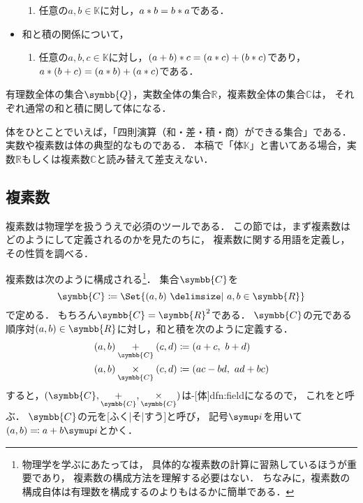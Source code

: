 \documentclass[../sotsu.tex]{subfiles}
\begin{document}
\begin{definition}[体]
\begin{itemize}
\begin{enumerate}[resume]
            \item \label{field:prod-commutative} 任意の$a, b \in 𝕂$に対し，$a \mathbin{\ast} b = b \mathbin{\ast} a$である．
        \end{enumerate}
        \item 和と積の関係について，
        \begin{enumerate}[resume]
            \item \label{field:distributive} 任意の$a, b, c \in 𝕂$に対し，$(a + b) \mathbin{\ast} c = (a \mathbin{\ast} c) + (b \mathbin{\ast} c)$であり，$a \mathbin{\ast} (b + c) = (a \mathbin{\ast} b) + (a \mathbin{\ast} c)$である．
        \end{enumerate}    
    \end{itemize}
\end{definition}

\begin{example}
    有理数全体の集合$\symbb{Q}$，実数全体の集合$ℝ$，複素数全体の集合$ℂ$は，
    それぞれ通常の和と積に関して体になる．
\end{example}

体をひとことでいえば，「四則演算（和・差・積・商）ができる集合」である．
実数や複素数は体の典型的なものである．
本稿で「体$𝕂$」と書いてある場合，実数$ℝ$もしくは複素数$ℂ$と読み替えて差支えない．



\subsection{複素数}
\label{sec:complex-number-field}

複素数は物理学を扱ううえで必須のツールである．
この節では，まず複素数はどのようにして定義されるのかを見たのちに，
複素数に関する用語を定義し，その性質を調べる．


複素数は次のように構成される\footnote{
    物理学を学ぶにあたっては，
    具体的な複素数の計算に習熟しているほうが重要であり，
    複素数の構成方法を理解する必要はない．
    ちなみに，複素数の構成自体は有理数を構成するのよりもはるかに簡単である．
}．
集合$\symbb{C}$を
\begin{equation}
    \symbb{C} \coloneq \Set{  (a, b)  \given  a, b \in \symbb{R}  }
\end{equation}
で定める．
もちろん$\symbb{C} = \symbb{R}^2$である．
$\symbb{C}$の元である順序対$(a, b) \in \symbb{R}$に対し，和と積を次のように定義する．
\begin{align}
    \label{eq:definition-of-sum-of-complex-number}
    (a, b) \underset{\symbb{C}}{+} (c, d) &\coloneq (a+c, \  b+d)  \\
    \label{eq:definition-of-product-of-complex-number}
    (a, b) \underset{\symbb{C}}{\times} (c, d) &\coloneq (ac-bd, \  ad+bc)
\end{align}
すると，$(\symbb{C}, \underset{\symbb{C}}{+}, \underset{\symbb{C}}{\times})$は-[体]{dfn:field}になるので，
これをと呼ぶ．
$\symbb{C}$の元を[ふく|そ|すう]と呼び，
記号$\iu$を用いて$(a, b) \eqcolon a + b\iu$とかく．
\end{document}
